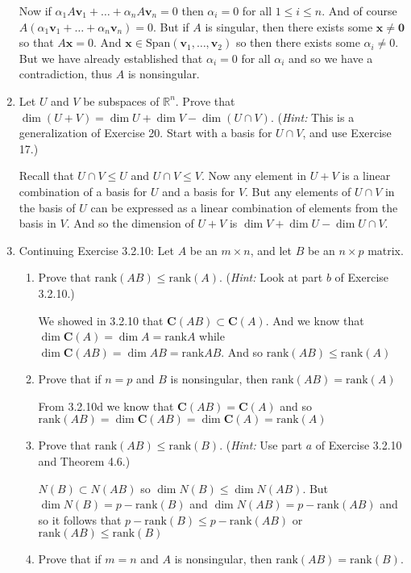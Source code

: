 \documentclass[letterpaper]{article}
\newcommand{\rank}{\text{rank}}
\newcommand{\Span}{\text{Span}}
\begin{document}
\begin{enumerate}
Now if $\alpha_1A\mathbf{v}_1+\dots+\alpha_nA\mathbf{v}_n=0$ then $\alpha_i=0$ for all $1\le i\le n$. And of course $A(\alpha_1\mathbf{v}_1+\dots+\alpha_n\mathbf{v}_n)=0$. But if $A$ is singular, then there exists some $\mathbf{x}\ne \mathbf{0}$ so that $A\mathbf{x}=0$. And $\mathbf{x}\in \Span(\mathbf{v}_1,\dots,\mathbf{v}_2)$ so then there exists some $\alpha_i\ne 0$. But we have already established that $\alpha_i=0$ for all $\alpha_i$ and so we have a contradiction, thus $A$ is nonsingular.
\setcounter{enumi}{20}
\item
Let $U$ and $V$ be subspaces of $\mathbb{R}^n$. Prove that $\dim(U+V)=\dim U+\dim V-\dim(U\cap V).$ (\emph{Hint:} This is a generalization of Exercise 20. Start with a basis for $U\cap V$, and use Exercise 17.)

Recall that $U\cap V\le U$ and $U\cap V\le V$. Now any element in $U+V$ is a linear combination of a basis for $U$ and a basis for $V$. But any elements of $U\cap V$ in the basis of $U$ can be expressed as a linear combination of elements from the basis in $V$. And so the dimension of $U+V$ is $\dim V+\dim U-\dim U\cap V$.
\item
Continuing Exercise 3.2.10: Let $A$ be an $m\times n$, and let $B$ be an $n\times p$ matrix.
  \begin{enumerate}
  \item
  Prove that $\rank(AB)\le \rank(A).$ (\emph{Hint:} Look at part $b$ of Exercise 3.2.10.)

  We showed in 3.2.10 that $\mathbf{C}(AB)\subset\mathbf{C}(A)$. And we know that $\dim \mathbf{C}(A)=\dim A=\rank A$ while $\dim \mathbf{C}(AB)=\dim AB=\rank AB$. And so $\rank(AB)\le \rank(A)$
  \item
  Prove that if $n=p$ and $B$ is nonsingular, then $\rank(AB)=\rank(A)$

  From 3.2.10d we know that $\mathbf{C}(AB)=\mathbf{C}(A)$ and so $\rank(AB)=\dim \mathbf{C}(AB)=\dim\mathbf{C}(A)=\rank(A)$
  \item
  Prove that $\rank(AB)\le \rank(B)$. (\emph{Hint:} Use part $a$ of Exercise 3.2.10 and Theorem 4.6.)

  $N(B)\subset N(AB)$ so $\dim N(B)\le \dim N(AB)$. But $\dim N(B)=p-\rank(B)$ and $\dim N(AB)=p-\rank(AB)$ and so it follows that $p-\rank(B)\le p-\rank(AB)$ or $\rank(AB)\le \rank(B)$
  \item
  Prove that if $m=n$ and $A$ is nonsingular, then $\rank(AB)=\rank(B)$.


\end{enumerate}
\end{enumerate}
\end{document}
